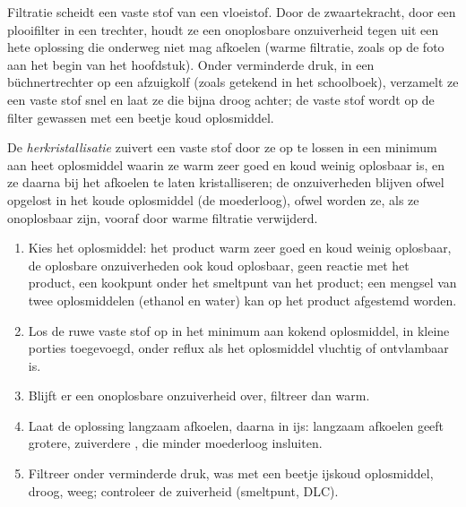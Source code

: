 Filtratie scheidt een vaste stof van een vloeistof. Door de zwaartekracht,
door een plooifilter in een trechter, houdt ze een onoplosbare
onzuiverheid tegen uit een hete oplossing die onderweg niet mag afkoelen
(warme filtratie, zoals op de foto aan het begin van het hoofdstuk). Onder
verminderde druk, in een büchnertrechter op een afzuigkolf (zoals
getekend in het schoolboek), verzamelt ze een vaste stof snel en laat ze
die bijna droog achter; de vaste stof wordt op de filter gewassen met een
beetje koud oplosmiddel.

\begin{definition}[Herkristallisatie]\label{def:b1:lab-techniques-1:recrystallisation}
De \emph{herkristallisatie} zuivert een vaste stof
door ze op te lossen in een minimum aan heet oplosmiddel waarin ze warm
zeer goed en koud weinig oplosbaar is, en ze daarna bij het afkoelen te
laten kristalliseren; de onzuiverheden blijven ofwel opgelost in het koude
oplosmiddel (de moederloog), ofwel worden ze, als ze onoplosbaar zijn,
vooraf door warme filtratie verwijderd.
\end{definition}

\begin{method}\label{met:b1:lab-techniques-1:recrystallise}
\begin{enumerate}
  \item Kies het oplosmiddel: het product warm zeer goed en koud weinig
        oplosbaar, de oplosbare onzuiverheden ook koud oplosbaar, geen
        reactie met het product, een kookpunt onder het smeltpunt van het
        product; een mengsel van twee  oplosmiddelen (ethanol en
        water) kan op het product afgestemd worden.
  \item Los de ruwe vaste stof op in het minimum aan kokend oplosmiddel,
        in kleine porties toegevoegd, onder reflux als het oplosmiddel
        vluchtig of ontvlambaar is.
  \item Blijft er een onoplosbare onzuiverheid over, filtreer dan warm.
  \item Laat de oplossing langzaam afkoelen, daarna in ijs: langzaam
        afkoelen geeft grotere, zuiverdere , die minder
        moederloog insluiten.
  \item Filtreer onder verminderde druk, was met een beetje ijskoud
        oplosmiddel, droog, weeg; controleer de zuiverheid (smeltpunt,
        DLC).
\end{enumerate}
\end{method}

